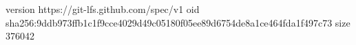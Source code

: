 version https://git-lfs.github.com/spec/v1
oid sha256:9ddb973ffb1c1f9cce4029d49c05180f05ee89d6754de8a1ce464fda1f497c73
size 376042
